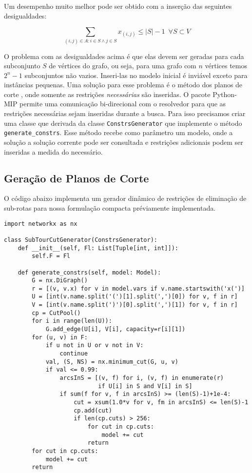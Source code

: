 \documentclass[a4paper,11pt,fleqn]{article}
\begin{document}
Um desempenho muito melhor pode ser obtido com a inserção das seguintes desigualdades:

\begin{equation}
\sum_{(i,j) \in A : i\in S \land j \in S} x_{(i,j)} \leq |S|-1 \,\,\, \forall S \subset V 
\end{equation}

O problema com as desigualdades acima é que elas devem ser geradas para cada subconjunto $S$ de vértices do grafo, ou seja, para uma grafo com $n$ vértices temos $2^n-1$ subconjuntos não vazios. Inseri-las no modelo inicial é inviável exceto para instâncias pequenas. Uma solução para esse problema é o método dos planos de corte \citep{Dantzig54}, onde somente as restrições \emph{necessárias} são inseridas. O pacote Python-MIP permite uma comunicação bi-direcional com o resolvedor para que as restrições necessárias sejam inseridas durante a busca. Para isso precisamos criar uma classe que derivada da classe \texttt{ConstrsGenerator} que implemente o método \texttt{generate\_constrs}. Esse método recebe como parâmetro um modelo, onde a solução a solução corrente pode ser consultada e restrições adicionais podem ser inseridas a medida do necessário.

\subsection{Geração de Planos de Corte}

O código abaixo implementa um gerador dinâmico de restrições de eliminação de sub-rotas para nossa formulação compacta préviamente implementada.

{\small
\begin{lstlisting}
import networkx as nx

class SubTourCutGenerator(ConstrsGenerator):
    def __init__(self, Fl: List[Tuple[int, int]]):
        self.F = Fl

    def generate_constrs(self, model: Model):
        G = nx.DiGraph()
        r = [(v, v.x) for v in model.vars if v.name.startswith('x(')]
        U = [int(v.name.split('(')[1].split(',')[0]) for v, f in r]
        V = [int(v.name.split(')')[0].split(',')[1]) for v, f in r]
        cp = CutPool()
        for i in range(len(U)):
            G.add_edge(U[i], V[i], capacity=r[i][1])
        for (u, v) in F:
            if u not in U or v not in V:
                continue
            val, (S, NS) = nx.minimum_cut(G, u, v)
            if val <= 0.99:
                arcsInS = [(v, f) for i, (v, f) in enumerate(r)
                           if U[i] in S and V[i] in S]
                if sum(f for v, f in arcsInS) >= (len(S)-1)+1e-4:
                    cut = xsum(1.0*v for v, fm in arcsInS) <= len(S)-1
                    cp.add(cut)
                    if len(cp.cuts) > 256:
                        for cut in cp.cuts:
                            model += cut
                        return
        for cut in cp.cuts:
            model += cut
        return
\end{lstlisting}}
\end{document}
